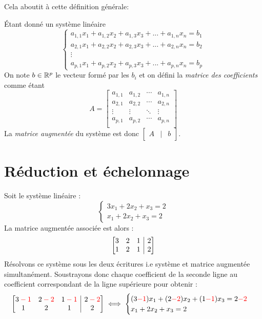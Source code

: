 Cela aboutit à cette définition générale:
\begin{boxdef}
Étant donné un système linéaire
$$\begin{cases} a_{1,1}x_1 + a_{1,2}x_2 + a_{1,3}x_3 + ... + a_{1, n}x_n = b_1 \\ a_{2,1}x_1 + a_{2,2}x_2 + a_{2,3}x_3 + ... + a_{2, n}x_n =b_2 \\ \vdots \\ a_{p,1}x_1 + a_{p,2}x_2 + a_{p,3}x_3 + ... + a_{p, n}x_n = b_p \end{cases}$$
On note $b \in \mathbb{R}^p$ le vecteur formé par les $b_i$ et on défini la \textit{matrice des coefficients} comme étant
$$A = \begin{bmatrix}
a_{1,1} & a_{1,2} & \cdots & a_{1,n} \\
a_{2,1} & a_{2,2} & \cdots & a_{2,n} \\
\vdots & \vdots & \ddots & \vdots \\
a_{p,1} & a_{p,2} & \cdots & a_{p,n} \\
\end{bmatrix}$$
La \textit{matrice augmentée} du système est donc $\begin{bmatrix}
A & | & b
\end{bmatrix}$.
\end{boxdef}

\section{Réduction et échelonnage}
\noindent Soit le système linéaire :
$$\begin{cases}
3x_1 + 2x_2 + x_3 = 2\\
x_1 + 2x_2 + x_3 = 2
\end{cases}
$$
La matrice augmentée associée est alors :
$$ 
\left[
\begin{array}{@{}ccc|c@{}}
3 & 2 & 1 & 2 \\
1 & 2 & 1 & 2 \\
\end{array}
\right]
$$
Résolvons ce système sous les deux écritures i.e système et matrice augmentée simultanément. Soustrayons donc chaque coefficient de la seconde ligne au coefficient correspondant de la ligne supérieure pour obtenir :
$$ 
\left[
\begin{array}{@{}ccc|c@{}}
3 \color{red} - 1 & 2 \color{red} -2 & 1  \color{red} - 1 & 2 \color{red} - 2 \\
1 & 2 & 1 & 2 \\
\end{array}
\right] 
\iff 
\begin{cases}
(3\textcolor{red}{-1})x_1 + (2\textcolor{red}{-2})x_2 + (1\textcolor{red}{-1})x_3 = 2\textcolor{red}{-2}\\
x_1 + 2x_2 + x_3 = 2
\end{cases}
$$

